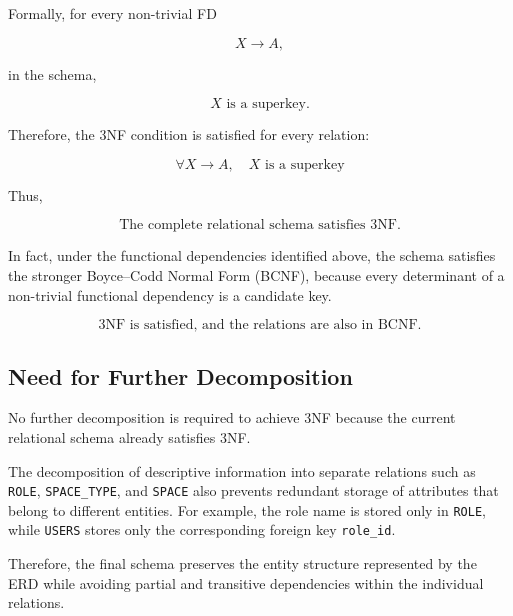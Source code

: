 Formally, for every non-trivial FD

\[
X \rightarrow A,
\]

in the schema,

\[
X \text{ is a superkey}.
\]

Therefore, the 3NF condition is satisfied for every relation:

\[
\boxed{
\forall X \rightarrow A,\quad
X \text{ is a superkey}
}
\]

Thus,

\[
\boxed{
\text{The complete relational schema satisfies 3NF.}
}
\]

In fact, under the functional dependencies identified above, the
schema satisfies the stronger Boyce--Codd Normal Form (BCNF), because
every determinant of a non-trivial functional dependency is a
candidate key.

\[
\boxed{
\text{3NF is satisfied, and the relations are also in BCNF.}
}
\]

\subsection{Need for Further Decomposition}

No further decomposition is required to achieve 3NF because the
current relational schema already satisfies 3NF.

The decomposition of descriptive information into separate relations
such as \texttt{ROLE}, \texttt{SPACE\_TYPE}, and \texttt{SPACE} also
prevents redundant storage of attributes that belong to different
entities. For example, the role name is stored only in
\texttt{ROLE}, while \texttt{USERS} stores only the corresponding
foreign key \texttt{role\_id}.

Therefore, the final schema preserves the entity structure represented
by the ERD while avoiding partial and transitive dependencies within
the individual relations.
